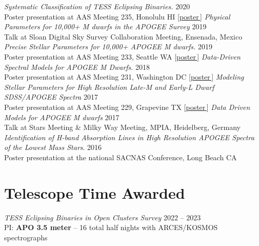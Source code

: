 \documentclass[a4,11pt]{article}
\let\orighref\href
\renewcommand{\href}[2]{\orighref{#1}{#2\,\scriptsize\faExternalLink}}
\begin{document}
\textsl{Systematic Classification of TESS Eclipsing Binaries.} \hfill 2020 \\
Poster presentation at AAS Meeting 235, Honolulu HI [\href{https://doi.org/10.5281/zenodo.3605647}{poster}] \vspace{.2cm} \newline
\textit{Physical Parameters for 10,000+ M dwarfs in the APOGEE Survey} \hfill 2019 \\ 
Talk at Sloan Digital Sky Survey Collaboration Meeting, Ensenada, Mexico \vspace{.2cm} \newline
\textsl{Precise Stellar Parameters for 10,000+ APOGEE M dwarfs.} \hfill 2019 \\
Poster presentation at AAS Meeting 233, Seattle WA [\href{https://doi.org/10.5281/zenodo.2536586}{poster}] \vspace{.2cm} \newline 
\textit{Data-Driven Spectral Models for APOGEE M Dwarfs}. \hfill 2018 \\
Poster presentation at AAS Meeting 231, Washington DC [\href{http://doi.org/10.5281/zenodo.1146909}{poster}] \vspace{.2cm} \newline
\textsl{Modeling Stellar Parameters for High Resolution Late-M and Early-L Dwarf SDSS/APOGEE Spectra} \hfill 2017 \\
Poster presentation at AAS Meeting 229, Grapevine TX [\href{http://doi.org/10.5281/zenodo.1116625}{poster}]  \vspace{.2cm} \newline
\textit{Data Driven Models for APOGEE M dwarfs} \hfill 2017 \\ 
Talk at Stars Meeting  \& Milky Way Meeting, MPIA, Heidelberg, Germany \vspace{.2cm} \newline
\textsl{Identification of H-band Absorption Lines in High Resolution APOGEE Spectra of the Lowest Mass Stars}. \hfill 2016 \\
Poster presentation at the national SACNAS Conference, Long Beach CA 

\section{Telescope Time Awarded}

\textsl{TESS Eclipsing Binaries in Open Clusters Survey} \hfill 2022 -- 2023 \\
PI: \textbf{APO 3.5 meter} -- 16 total half nights with ARCES/KOSMOS spectrographs \vspace{.2cm} 
\end{document}
